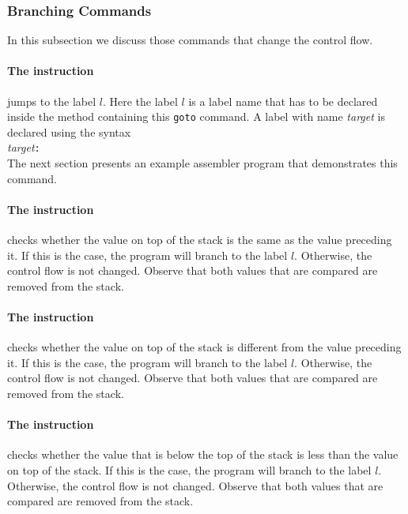 \subsubsection{Branching Commands}
In this subsection we discuss those commands that change the control flow.

\paragraph{The instruction }
jumps to the label $l$.  Here the label $l$ is a label name that has to be declared inside the
method containing this \texttt{goto} command.  A label with name \textsl{target} is declared using the syntax
\\[0.2cm]
\hspace*{1.3cm}
\textsl{target}\texttt{:}
\\[0.2cm]
The next section presents an example assembler program that demonstrates this command.
 
\paragraph{The instruction }
checks whether the value on top of the stack is the same as the value preceding it.  If this is the case, the program will branch
to the label $l$.  Otherwise, the control flow is not changed.  Observe that both values that are
compared are removed from the stack.

\paragraph{The instruction }
checks whether the value on top of the stack is different from the value preceding it.  If this is the case, the program will branch
to the label $l$.  Otherwise, the control flow is not changed.  Observe that both values that are
compared are removed from the stack.

\paragraph{The instruction }
checks whether the value that is below the top of the stack is less than the value on top of the stack.  If this is the case, the program will branch
to the label $l$.  Otherwise, the control flow is not changed.  Observe that both values that are
compared are removed from the stack.

